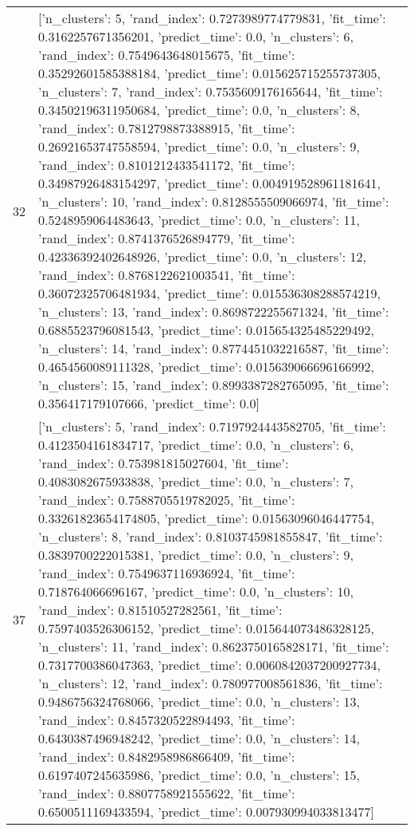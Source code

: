 \begin{tabular}{rl}
32 & [{'n_clusters': 5, 'rand_index': 0.7273989774779831, 'fit_time': 0.3162257671356201, 'predict_time': 0.0}, {'n_clusters': 6, 'rand_index': 0.7549643648015675, 'fit_time': 0.35292601585388184, 'predict_time': 0.015625715255737305}, {'n_clusters': 7, 'rand_index': 0.7535609176165644, 'fit_time': 0.34502196311950684, 'predict_time': 0.0}, {'n_clusters': 8, 'rand_index': 0.7812798873388915, 'fit_time': 0.26921653747558594, 'predict_time': 0.0}, {'n_clusters': 9, 'rand_index': 0.8101212433541172, 'fit_time': 0.34987926483154297, 'predict_time': 0.004919528961181641}, {'n_clusters': 10, 'rand_index': 0.8128555509066974, 'fit_time': 0.5248959064483643, 'predict_time': 0.0}, {'n_clusters': 11, 'rand_index': 0.8741376526894779, 'fit_time': 0.42336392402648926, 'predict_time': 0.0}, {'n_clusters': 12, 'rand_index': 0.8768122621003541, 'fit_time': 0.36072325706481934, 'predict_time': 0.015536308288574219}, {'n_clusters': 13, 'rand_index': 0.8698722255671324, 'fit_time': 0.6885523796081543, 'predict_time': 0.015654325485229492}, {'n_clusters': 14, 'rand_index': 0.8774451032216587, 'fit_time': 0.4654560089111328, 'predict_time': 0.015639066696166992}, {'n_clusters': 15, 'rand_index': 0.8993387282765095, 'fit_time': 0.356417179107666, 'predict_time': 0.0}] \\
37 & [{'n_clusters': 5, 'rand_index': 0.7197924443582705, 'fit_time': 0.4123504161834717, 'predict_time': 0.0}, {'n_clusters': 6, 'rand_index': 0.753981815027604, 'fit_time': 0.4083082675933838, 'predict_time': 0.0}, {'n_clusters': 7, 'rand_index': 0.7588705519782025, 'fit_time': 0.33261823654174805, 'predict_time': 0.01563096046447754}, {'n_clusters': 8, 'rand_index': 0.8103745981855847, 'fit_time': 0.3839700222015381, 'predict_time': 0.0}, {'n_clusters': 9, 'rand_index': 0.7549637116936924, 'fit_time': 0.718764066696167, 'predict_time': 0.0}, {'n_clusters': 10, 'rand_index': 0.81510527282561, 'fit_time': 0.7597403526306152, 'predict_time': 0.015644073486328125}, {'n_clusters': 11, 'rand_index': 0.8623750165828171, 'fit_time': 0.7317700386047363, 'predict_time': 0.0060842037200927734}, {'n_clusters': 12, 'rand_index': 0.780977008561836, 'fit_time': 0.9486756324768066, 'predict_time': 0.0}, {'n_clusters': 13, 'rand_index': 0.8457320522894493, 'fit_time': 0.6430387496948242, 'predict_time': 0.0}, {'n_clusters': 14, 'rand_index': 0.8482958986866409, 'fit_time': 0.6197407245635986, 'predict_time': 0.0}, {'n_clusters': 15, 'rand_index': 0.8807758921555622, 'fit_time': 0.6500511169433594, 'predict_time': 0.007930994033813477}] \\

\end{tabular}
